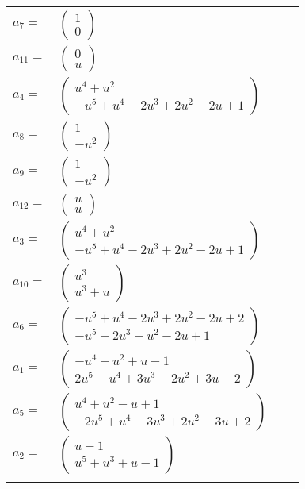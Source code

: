 \documentclass[1p]{elsarticle_modified}
\theoremstyle{definition}
\begin{document}
\begin{tabular}{m{7pt} m{180pt} m{7pt} m{180pt} }
\flushright $a_{7}=$&$\begin{pmatrix}1\\0\end{pmatrix}$ \\
\flushright $a_{11}=$&$\begin{pmatrix}0\\u\end{pmatrix}$ \\
\flushright $a_{4}=$&$\begin{pmatrix}u^4+u^2\\- u^5+u^4-2 u^3+2 u^2-2 u+1\end{pmatrix}$ \\
\flushright $a_{8}=$&$\begin{pmatrix}1\\- u^2\end{pmatrix}$ \\
\flushright $a_{9}=$&$\begin{pmatrix}1\\- u^2\end{pmatrix}$ \\
\flushright $a_{12}=$&$\begin{pmatrix}u\\u\end{pmatrix}$ \\
\flushright $a_{3}=$&$\begin{pmatrix}u^4+u^2\\- u^5+u^4-2 u^3+2 u^2-2 u+1\end{pmatrix}$ \\
\flushright $a_{10}=$&$\begin{pmatrix}u^3\\u^3+u\end{pmatrix}$ \\
\flushright $a_{6}=$&$\begin{pmatrix}- u^5+u^4-2 u^3+2 u^2-2 u+2\\- u^5-2 u^3+u^2-2 u+1\end{pmatrix}$ \\
\flushright $a_{1}=$&$\begin{pmatrix}- u^4- u^2+u-1\\2 u^5- u^4+3 u^3-2 u^2+3 u-2\end{pmatrix}$ \\
\flushright $a_{5}=$&$\begin{pmatrix}u^4+u^2- u+1\\-2 u^5+u^4-3 u^3+2 u^2-3 u+2\end{pmatrix}$ \\
\flushright $a_{2}=$&$\begin{pmatrix}u-1\\u^5+u^3+u-1\end{pmatrix}$\\&\end{tabular}
\end{document}
